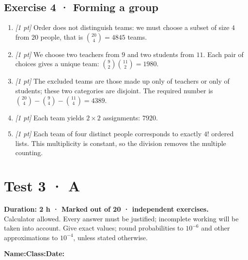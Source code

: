 \subsection*{Exercise 4 · Forming a group}\begin{enumerate}

\item \textit{[1 pt]} Order does not distinguish teams: we must choose a subset of size $4$ from $20$ people, that is $\binom{20}4=4845$ teams.

\item \textit{[1 pt]} We choose two teachers from $9$ and two students from $11$. Each pair of choices gives a unique team: $\binom{9}2\binom{11}2=1980$.

\item \textit{[1 pt]} The excluded teams are those made up only of teachers or only of students; these two categories are disjoint. The required number is $\binom{20}4-\binom{9}4-\binom{11}4=4389$.

\item \textit{[1 pt]} Each team yields $2\times2$ assignments: $7920$.

\item \textit{[1 pt]} Each team of four distinct people corresponds to exactly $4!$ ordered lists. This multiplicity is constant, so the division removes the multiple counting.

\end{enumerate}

\fi

\ifmxteacher

\mxnewpage{}\label{sujet:4-3}

\section*{Test 3 · A}


\textbf{Duration: 2 h · Marked out of 20 ·  independent exercises.}\\Calculator allowed. Every answer must be justified; incomplete working will be taken into account. Give exact values; round probabilities to $10^{-6}$ and other approximations to $10^{-4}$, unless stated otherwise.

\smallskip\textbf{Name:}\enspace\dotfill\quad\textbf{Class:}\enspace\dotfill\quad\textbf{Date:}\enspace\dotfill

